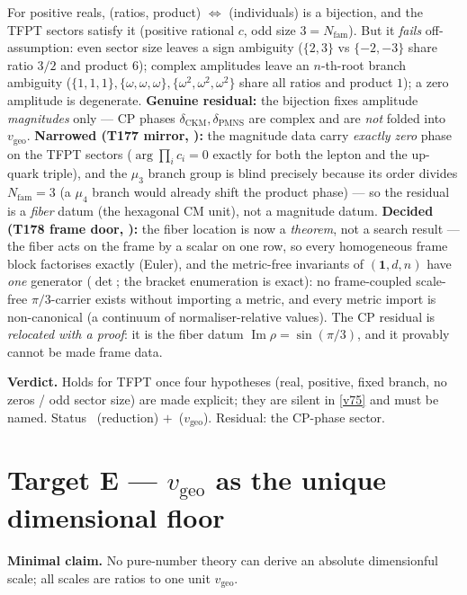 \documentclass[11pt,a4paper]{article}
\newcommand{\vgeo}{v_{\mathrm{geo}}}
\newcommand{\Nfam}{N_{\mathrm{fam}}}
\begin{document}
\begin{keybox}
For positive reals, (ratios, product) $\Leftrightarrow$ (individuals) is a bijection, and the TFPT
sectors satisfy it (positive rational $c$, odd size $3=\Nfam$). But it \emph{fails} off-assumption:
even sector size leaves a sign ambiguity ($\{2,3\}$ vs $\{-2,-3\}$ share ratio $3/2$ and product
$6$); complex amplitudes leave an $n$-th-root branch ambiguity ($\{1,1,1\},\{\omega,\omega,\omega\},
\{\omega^2,\omega^2,\omega^2\}$ share all ratios and product $1$); a zero amplitude is degenerate.
\textbf{Genuine residual:} the bijection fixes amplitude \emph{magnitudes} only --- CP phases
$\delta_{\mathrm{CKM}},\delta_{\mathrm{PMNS}}$ are complex and are \emph{not} folded into $\vgeo$.
\textbf{Narrowed (T177 mirror, ):} the magnitude data carry
\emph{exactly zero} phase on the TFPT sectors ($\arg\prod_ic_i=0$ exactly for both the lepton and
the up-quark triple), and the $\mu_3$ branch group is blind precisely because its order divides
$\Nfam=3$ (a $\mu_4$ branch would already shift the product phase) --- so the residual is a
\emph{fiber} datum (the hexagonal CM unit), not a magnitude datum.
\textbf{Decided (T178 frame door, ):} the fiber location is now a
\emph{theorem}, not a search result --- the fiber acts on the frame by a scalar on one row, so every
homogeneous frame block factorises exactly (Euler), and the metric-free invariants of $(\mathbf1,d,n)$
have \emph{one} generator ($\det$; the bracket enumeration is exact): no frame-coupled scale-free
$\pi/3$-carrier exists without importing a metric, and every metric import is non-canonical (a
continuum of normaliser-relative values). The CP residual is \emph{relocated with a proof}: it is the
fiber datum $\operatorname{Im}\rho=\sin(\pi/3)$, and it provably cannot be made frame data.
\end{keybox}

\noindent\textbf{Verdict.} Holds for TFPT once four hypotheses (real, positive, fixed branch, no
zeros / odd sector size) are made explicit; they are silent in \vref{v75} and must be named. Status \mE\,
(reduction) $+$ \mO\,($\vgeo$). Residual: the CP-phase sector.

\section*{Target E --- $\vgeo$ as the unique dimensional floor}\label{sec:E}
\noindent\textbf{Minimal claim.} No pure-number theory can derive an absolute dimensionful scale; all
scales are ratios to one unit $\vgeo$.
\end{document}

